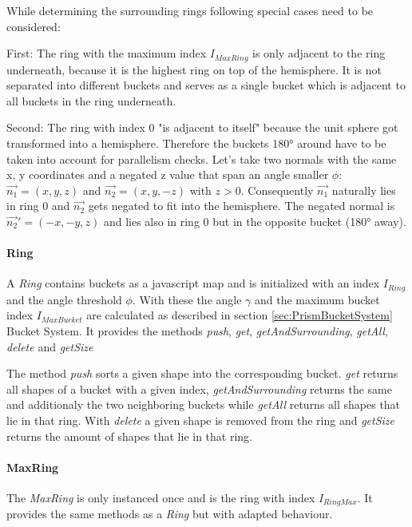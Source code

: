 \documentclass[../ClassicThesis.tex]{subfiles}
\begin{document}
While determining the surrounding rings following special cases need to be considered:

First: The ring with the maximum index $I_{MaxRing}$ is only adjacent to the ring underneath, because it is the highest ring on top of the hemisphere. It is not separated into different buckets and serves as a single bucket which is adjacent to all buckets in the ring underneath.

Second: The ring with index 0 "is adjacent to itself" because the unit sphere got transformed into a hemisphere. Therefore the buckets 180° around have to be taken into account for parallelism checks. Let's take two normals with the same x, y coordinates and a negated z value that span an angle smaller $ \phi $: $\vec{n_{1}} = (x, y, z)$ and $\vec{n_{2}} = (x, y, -z)$ with $z > 0$. Consequently $\vec{n_{1}}$ naturally lies in ring 0 and $\vec{n_{2}}$ gets negated to fit into the hemisphere. The negated normal is $\vec{n_{2}}' = (-x, -y, z) $ and lies also in ring 0 but in the opposite bucket (180° away).  


\paragraph{Ring}

A \emph{Ring} contains buckets as a javascript map and is initialized with an index $ I_{Ring} $ and the angle threshold $ \phi$. With these the angle $ \gamma $ and the maximum bucket index $ I_{MaxBucket} $ are calculated as described in section \ref{sec:PrismBucketSystem} Bucket System. It provides the methods \emph{push}, \emph{get}, \emph{getAndSurrounding}, \emph{getAll}, \emph{delete} and \emph{getSize}

The method \emph{push} sorts a given shape into the corresponding bucket. \emph{get} returns all shapes of a bucket with a given index, \emph{getAndSurrounding} returns the same and additionaly the two neighboring buckets while \emph{getAll} returns all shapes that lie in that ring. With \emph{delete} a given shape is removed from the ring and \emph{getSize} returns the amount of shapes that lie in that ring. 


\paragraph{MaxRing} The \emph{MaxRing} is only instanced once and is the ring with index $ I_{RingMax} $. It provides the same methods as a \emph{Ring} but with adapted behaviour.
\end{document}

